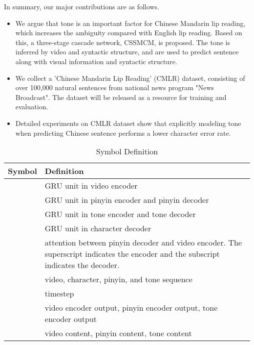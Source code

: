 \documentclass[sigconf]{acmart}
\begin{document}
In summary, our major contributions are as follows.
\begin{itemize}
\item We argue that tone is an important factor for Chinese Mandarin lip reading, which increases the ambiguity compared with English lip reading. Based on this, a three-stage cascade network, CSSMCM, is proposed. The tone is inferred by video and syntactic structure, and are used to predict sentence along with visual information and syntactic structure.
\item We collect a 'Chinese Mandarin Lip Reading' (CMLR) dataset, consisting of over 100,000 natural sentences from national news program "News Broadcast". The dataset will be released as a resource for training and evaluation.
\item Detailed experiments on CMLR dataset show that explicitly modeling tone when predicting Chinese sentence performs a lower character error rate.
\end{itemize}

\begin{table}[htb]
\small
\centering
\caption {Symbol Definition}
\label{table:symbol_definition}
\begin{tabular}{l | p{5.8cm}}
  \hline 
  \textbf{Symbol}     & \textbf{Definition}                                     \\ \hline     
        &  GRU unit in video encoder                                \\ \hline
        &  GRU unit in pinyin encoder and pinyin decoder\\ \hline    
        &  GRU unit in tone encoder and tone decoder    \\ \hline
        &  GRU unit in character decoder                            \\ \hline
      & attention between pinyin decoder and video encoder. The superscript indicates the encoder and the subscript indicates the decoder.\\ \hline
        &  video, character, pinyin, and tone sequence              \\ \hline
             & timestep \\ \hline
     &  video encoder output, pinyin encoder output, tone encoder output                \\ \hline
     &  video content, pinyin content, tone content               \\ \hline
\end{tabular} 
\end{table}
\end{document}
